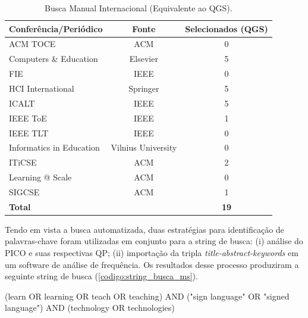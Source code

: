 \begin{table}[htb]
\centering
\caption{Busca Manual Internacional (Equivalente ao QGS).}
\label{ms:table:busca-manual-internacional}
\begin{tabular}{l|c|c} \hline
\textbf{Conferência/Periódico} & \textbf{Fonte}     & \textbf{Selecionados (QGS)} \\ \hline
ACM TOCE                       & ACM                & 0            \\ 
Computers \& Education         & Elsevier           & 5            \\ 
FIE                            & IEEE               & 0            \\ 
HCI International              & Springer           & 5            \\ 
ICALT                          & IEEE               & 5            \\ 
IEEE ToE                       & IEEE               & 1            \\ 
IEEE TLT                       & IEEE               & 0            \\ 
Informatics in Education       & Vilnius University & 0            \\ 
ITiCSE                         & ACM                & 2            \\ 
Learning @ Scale               & ACM                & 0            \\ 
SIGCSE                         & ACM                & 1            \\ \hline
\multicolumn{2}{l}{\textbf{Total}}                  & \textbf{19}  \\ \hline
\end{tabular}
\end{table}

Tendo em vista a busca automatizada, duas estratégias para identificação de palavras-chave foram utilizadas em conjunto para a string de busca: (i) análise do PICO e suas respectivas QP; (ii) importação da tripla \textit{title-abstract-keywords} em um software de análise de frequência. Os resultados desse processo produziram a seguinte string de busca (\autoref{codigo:string_busca_ms}).

\begin{codigo}[caption={String de Busca do MS}, label={codigo:string_busca_ms}]
    (learn OR learning OR teach OR teaching) AND
    ("sign language" OR "signed language") AND
    (technology OR technologies)
\end{codigo}

